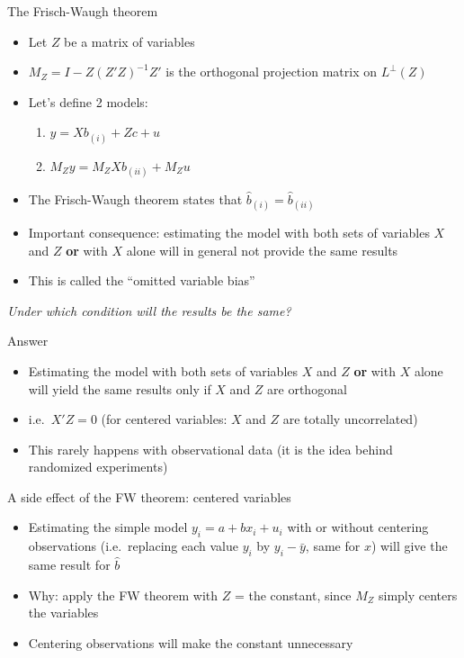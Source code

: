 \documentclass[aspectratio=169]{beamer}
\begin{document}
\begin{frame}{The Frisch-Waugh theorem}
\begin{itemize}
    \item Let $Z$ be a matrix of variables
    \item $M_Z = I - Z(Z'Z)^{-1}Z'$ is the orthogonal projection matrix on $L^{\perp}(Z)$
    \item Let's define 2 models:
    \begin{enumerate}
        \item $y = Xb_{(i)} + Zc + u$
        \item $M_Zy = M_ZXb_{(ii)} + M_Zu$
    \end{enumerate}
    \item The Frisch-Waugh theorem states that $\hat{b}_{(i)} = \hat{b}_{(ii)}$
    \item Important consequence: estimating the model with both sets of variables $X$ and $Z$ \textbf{or} with $X$ alone will in general not provide the same results
    \item This is called the ``omitted variable bias''
\end{itemize}

\textit{Under which condition will the results be the same?}
\end{frame}

\begin{frame}{Answer}
\begin{itemize}
    \item Estimating the model with both sets of variables $X$ and $Z$ \textbf{or} with $X$ alone will yield the same results only if $X$ and $Z$ are orthogonal
    \item i.e.\ $X'Z = 0$ (for centered variables: $X$ and $Z$ are totally uncorrelated)
    \item This rarely happens with observational data (it is the idea behind randomized experiments)
\end{itemize}
\end{frame}

\begin{frame}{A side effect of the FW theorem: centered variables}
\begin{itemize}
    \item Estimating the simple model $y_i = a + b x_i + u_i$ with or without centering observations (i.e.\ replacing each value $y_i$ by $y_i - \bar{y}$, same for $x$) will give the same result for $\hat{b}$
    \item Why: apply the FW theorem with $Z$ = the constant, since $M_Z$ simply centers the variables
    \item Centering observations will make the constant unnecessary
\end{itemize}
\end{frame}
\end{document}
